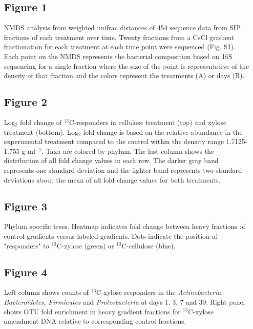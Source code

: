 \subsection{Figure 1}
NMDS analysis from weighted unifrac distances of 454 sequence data from SIP fractions of each treatment over time. Twenty fractions from a CsCl gradient fractionation for each treatment at each time point were sequenced (Fig. S1). Each point on the NMDS represents the bacterial composition based on 16S sequencing for a single fraction where the size of the point is representative of the density of that fraction and the colors represent the treatments (A) or days (B). 
\subsection{Figure 2}
Log$_{2}$ fold change of $^{13}$C-responders in cellulose
treatment (top) and xylose treatment (bottom).  Log$_{2}$ fold change is based
on the relative abundance in the experimental treatment compared to the control
within the density range 1.7125-1.755 g ml$^{-1}$. Taxa are
colored by phylum. The last column shows the distribution of all fold change values in each row. The darker gray band represents one standard deviation and the lighter band represents two standard deviations about the mean of all fold change values for both treatments.  

    
    \subsection{Figure 3}
Phylum specific trees. Heatmap indicates fold change between heavy fractions of control gradients versus labeled gradients. Dots indicate the position of "responders" to $^{13}$C-xylose (green) or $^{13}$C-cellulose (blue).\subsection{Figure 4}
Left column shows counts of $^{13}$C-xylose responders in the \textit{Actinobacteria, Bacteroidetes, Firmicutes} and \textit{Proteobacteria} at days 1, 3, 7 and 30. Right panel shows OTU fold enrichment in heavy gradient fractions for $^{13}$C-xylose amendment DNA relative to corresponding control fractions. 
